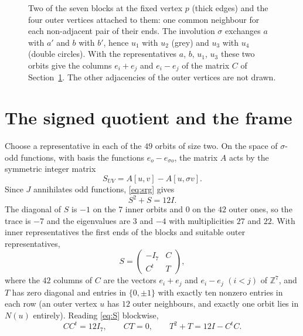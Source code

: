 \documentclass[11pt]{amsart}
\theoremstyle{definition}
\theoremstyle{remark}
\newcommand{\Z}{\mathbb{Z}}
\newcommand{\s}{\sigma}
\begin{document}
\begin{figure}[ht]
\centering
{}
\caption{Two of the seven blocks at the fixed vertex $p$ (thick edges) and the four outer vertices attached to them: one
common neighbour for each non-adjacent pair of their ends. The involution $\s$ exchanges $a$ with $a'$ and $b$ with $b'$,
hence $u_1$ with $u_2$ (grey) and $u_3$ with $u_4$ (double circles). With the representatives $a$, $b$, $u_1$, $u_3$ these two
orbits give the columns $e_i+e_j$ and $e_i-e_j$ of the matrix $C$ of Section~\ref{sec:frame}. The other adjacencies of the
outer vertices are not drawn.}\label{fig:local}
\end{figure}

\section{The signed quotient and the frame}\label{sec:frame}

Choose a representative in each of the $49$ orbits of size two. On the space of $\s$-odd functions, with basis the functions
$e_o-e_{\s o}$, the matrix $A$ acts by the symmetric integer matrix
\[
S_{UV}=A[u,v]-A[u,\s v] .
\]
Since $J$ annihilates odd functions, \eqref{eq:srg} gives
\begin{equation}\label{eq:S}
S^2+S=12I .
\end{equation}
The diagonal of $S$ is $-1$ on the $7$ inner orbits and $0$ on the $42$ outer ones, so the trace is $-7$ and the eigenvalues
are $3$ and $-4$ with multiplicities $27$ and $22$. With inner representatives the first ends of the blocks and suitable outer
representatives,
\[
S=\begin{pmatrix}-I_7 & C\\ C^{t} & T\end{pmatrix},
\]
where the $42$ columns of $C$ are the vectors $e_i+e_j$ and $e_i-e_j$ $(i<j)$ of $\Z^7$, and $T$ has zero diagonal and
entries in $\{0,\pm1\}$ with exactly ten nonzero entries in each row (an outer vertex $u$ has $12$ outer neighbours, and
exactly one orbit lies in $N(u)$ entirely). Reading \eqref{eq:S} blockwise,
\begin{equation}\label{eq:blocks}
CC^{t}=12I_7,\qquad CT=0,\qquad T^2+T=12I-C^{t}C .
\end{equation}
\end{document}
